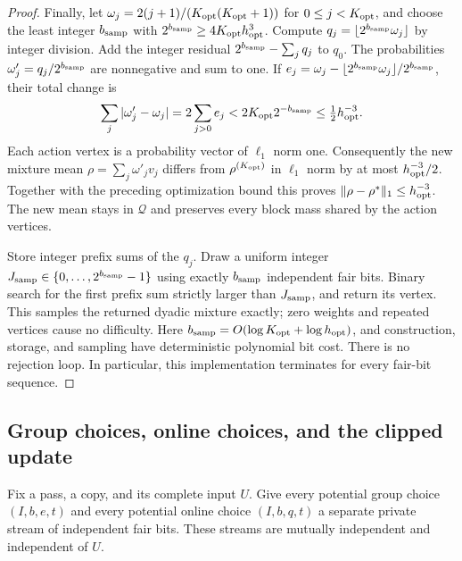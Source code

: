 \documentclass[11pt]{article}
\theoremstyle{definition}
\newcommand{\1}{\mathbf 1}
\newcommand{\QQ}{\mathcal Q}
\begin{document}
\begin{proof}
Finally, let $\omega_j=2(j+1)/(K_{\rm opt}(K_{\rm opt}+1))$ for $0\le j<K_{\rm opt}$, and choose
the least integer $b_{\rm samp}$ with $2^{b_{\rm samp}}\ge4K_{\rm opt}h_{\rm opt}^3$. Compute
$q_j=\lfloor2^{b_{\rm samp}}\omega_j\rfloor$ by integer division. Add the integer
residual $2^{b_{\rm samp}}-\sum_jq_j$ to $q_0$. The probabilities
$\omega'_j=q_j/2^{b_{\rm samp}}$ are nonnegative and sum to one. If
$e_j=\omega_j-\lfloor2^{b_{\rm samp}}\omega_j\rfloor/2^{b_{\rm samp}}$, their total change is
\[
 \sum_j|\omega'_j-\omega_j|
 =2\sum_{j>0}e_j<2K_{\rm opt}2^{-b_{\rm samp}}\le\tfrac12h_{\rm opt}^{-3}.
\]
Each action vertex is a probability vector of $\ell_1$ norm one.
Consequently the new mixture mean $\rho=\sum_j\omega'_jv_j$ differs
from $\rho^{(K_{\rm opt})}$ in $\ell_1$ norm by at most $h_{\rm opt}^{-3}/2$. Together with
the preceding optimization bound this proves
$\|\rho-\rho^*\|_1\le h_{\rm opt}^{-3}$. The new mean stays in $\QQ$ and
preserves every block mass shared by the action vertices.

Store integer prefix sums of the $q_j$. Draw a uniform integer
$J_{\rm samp}\in\{0,\ldots,2^{b_{\rm samp}}-1\}$ using exactly $b_{\rm samp}$ independent fair bits.
Binary search for the first prefix sum strictly larger than $J_{\rm samp}$, and
return its vertex. This samples the returned dyadic mixture exactly;
zero weights and repeated vertices cause no difficulty. Here
$b_{\rm samp}=O(\log K_{\rm opt}+\log h_{\rm opt})$, and construction, storage, and sampling have
deterministic polynomial bit cost. There is no rejection loop. In
particular, this implementation terminates for every fair-bit sequence.
\end{proof}

\subsection{Group choices, online choices, and the clipped update}

Fix a pass, a copy, and its complete input $U$.
Give every potential group choice $(I,b,e,t)$ and every potential online
choice $(I,b,q,t)$ a separate private stream of independent fair bits.
These streams are mutually independent and independent of $U$.
\end{document}
